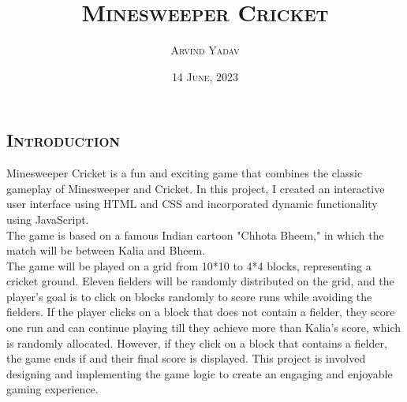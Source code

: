 \documentclass{article}
\title{\textsc{Minesweeper Cricket}}
\author{\textsc{Arvind Yadav}}
\date{\textsc{14 June, 2023}}
\begin{document}
\maketitle
\tableofcontents
\clearpage
    \begin{flushleft}
\section{\textsc{Introduction}}

        Minesweeper Cricket is a fun and exciting game that combines the classic gameplay of Minesweeper and Cricket. In this project, I created an interactive user interface using HTML and CSS and incorporated dynamic functionality using JavaScript. \\
        The game is based on a famous Indian cartoon "Chhota Bheem," in which the match will be between Kalia and Bheem.\\
        The game will be played on a grid from 10*10 to 4*4 blocks, representing a cricket ground. Eleven fielders will be randomly distributed on the grid, and the player's goal is to click on blocks randomly to score runs while avoiding the fielders. If the player clicks on a block that does not contain a fielder, they score one run and can continue playing till they achieve more than Kalia's score, which is randomly allocated. However, if they click on a block that contains a fielder, the game ends if and their final score is displayed. This project is involved designing and implementing the game logic to create an engaging and enjoyable gaming experience.


\end{flushleft}
\end{document}

